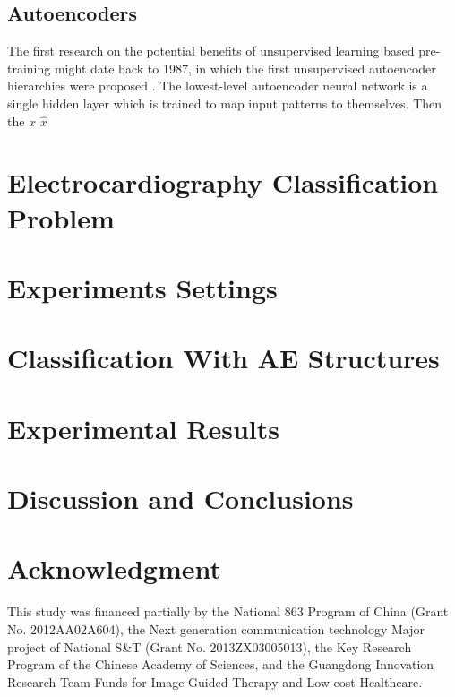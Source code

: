\documentclass[journal]{IEEEtran}
\begin{document}
\subsection{Autoencoders}
The first research on the potential benefits of unsupervised learning based pre-training might date back to 1987, in which the first unsupervised autoencoder hierarchies were proposed \cite{ballard1987modular}. The lowest-level autoencoder neural network is a single hidden layer which is trained to map input patterns to themselves. Then the  $x$ $\hat{x}$





\section{Electrocardiography Classification Problem}





\section{Experiments Settings}




\section{Classification With AE Structures}





\section{Experimental Results}





\section{Discussion and Conclusions}








\section*{Acknowledgment}
This study was financed partially by the National 863 Program of China (Grant No. 2012AA02A604), the Next generation communication technology Major project of National S\&T (Grant No. 2013ZX03005013), the Key Research Program of the Chinese Academy of Sciences, and the Guangdong Innovation Research Team Funds for Image-Guided Therapy and Low-cost Healthcare. 
\ifCLASSOPTIONcaptionsoff
  \newpage
\fi
\end{document}
